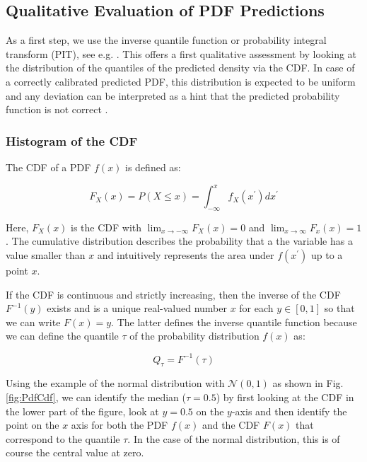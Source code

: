 \documentclass[BCOR=1mm, DIV=calc,10pt,
twoside=true,
twocolumn,
headings=normal]{scrartcl}
\newcommand{\fig}{Fig. }
\begin{document}
\subsection{Qualitative Evaluation of PDF Predictions}

As a first step, we use the inverse quantile function or probability integral transform (PIT), see e.g. \cite{Angus1994,casella2002statistical}. This offers a first qualitative assessment by looking at the distribution of the quantiles of the predicted density via the CDF. In case of a correctly calibrated predicted PDF, this distribution is expected to be uniform and any deviation can be interpreted as a hint that the predicted probability function is not correct \cite{diebold1998vevaluating}.

\subsubsection{Histogram of the CDF}
\label{sec:cdf_histo}

The CDF of a PDF $f(x)$ is defined as:

\begin{equation}
\label{eqn:CDF}
F_X(x) = P(X \le x) = \int_{-\infty}^{x} f_X(x^\prime) dx^\prime
\end{equation}

Here, $F_X(x)$ is the CDF with $\lim_{x \to -\infty}F_X(x) = 0$ and $\lim_{x \to \infty}F_x(x) = 1$. The cumulative distribution describes the probability that a the variable has a value smaller than $x$ and intuitively represents the area under $f(x^\prime)$ up to a point $x$.

If the CDF is continuous and strictly increasing, then the inverse of the CDF $F^{-1}(y)$ exists and is a unique real-valued number $x$ for each $y \in [0,1]$ so that we can write $F(x) = y$. The latter defines the inverse quantile function because we can define the quantile $\tau$ of the probability distribution $f(x)$ as:

\begin{equation}
Q_\tau = F^{-1}(\tau)
\end{equation}

Using the example of the normal distribution with $\mathcal{N}(0,1)$ as shown in \fig \ref{fig:PdfCdf}, we can identify the median ($\tau = 0.5$) by first looking at the CDF in the lower part of the figure, look at $y=0.5$ on the $y$-axis and then identify the point on the $x$ axis for both the PDF $f(x)$ and the CDF $F(x)$ that correspond to the quantile $\tau$. In the case of the normal distribution, this is of course the central value at zero.
\end{document}
